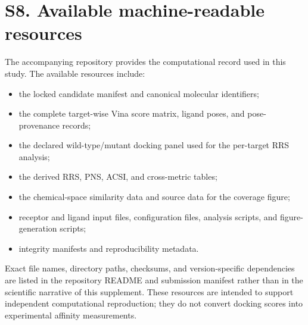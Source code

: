 \documentclass[journal=jcisd8,manuscript=suppinfo]{achemso}
\begin{document}
\section*{S8. Available machine-readable resources}
The accompanying repository provides the computational record used in this study. The available resources include:
\begin{itemize}
    \item the locked candidate manifest and canonical molecular identifiers;
    \item the complete target-wise Vina score matrix, ligand poses, and pose-provenance records;
    \item the declared wild-type/mutant docking panel used for the per-target RRS analysis;
    \item the derived RRS, PNS, ACSI, and cross-metric tables;
    \item the chemical-space similarity data and source data for the coverage figure;
    \item receptor and ligand input files, configuration files, analysis scripts, and figure-generation scripts;
    \item integrity manifests and reproducibility metadata.
\end{itemize}
Exact file names, directory paths, checksums, and version-specific dependencies are listed in the repository README and submission manifest rather than in the scientific narrative of this supplement. These resources are intended to support independent computational reproduction; they do not convert docking scores into experimental affinity measurements.


\end{document}
